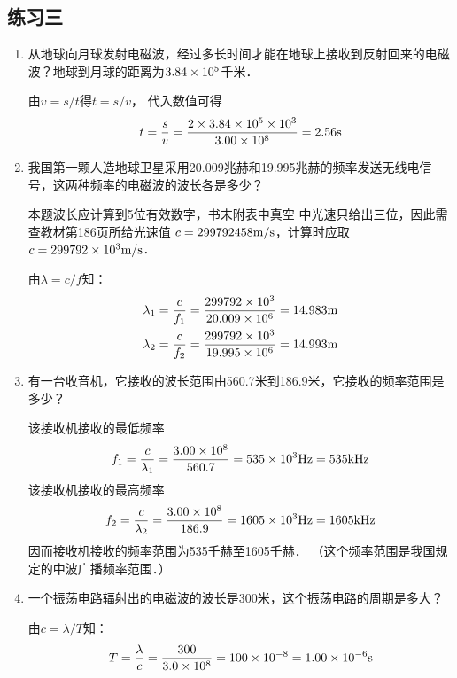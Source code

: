 \subsection{练习三}
\begin{enumerate}
	\item 从地球向月球发射电磁波，经过多长时间才能在地球上接收到反射回来的电磁波？地球到月球的距离为$3.84\times10^5$千米．

    \begin{solution}
由$v=s/t$得$t=s/v$，  代入数值可得
\[t=\frac{s}{v}=\frac{2\times 3.84\times10^5\times 10^3}{3.00\times 10^8}=2.56{\rm s}\]
    \end{solution}
    
	\item 我国第一颗人造地球卫星采用20.009兆赫和19.995兆赫的频率发送无线电信号，这两种频率的电磁波的波长各是多少？

    \begin{solution}
        本题波长应计算到5位有效数字，书末附表中真空
        中光速只给出三位，因此需查教材第186页所给光速值
        $c=299792458\text{m}/\text{s}$，计算时应取$c=299792\times10^3\text{m}/\text{s}$．

由$\lambda=c/f$知：
\[\begin{split}
\lambda_1&=\frac{c}{f_1}=\frac{299792\times10^3}{20.009\times 10^6}=14.983{\rm m}\\
\lambda_2&=\frac{c}{f_2}=\frac{299792\times10^3}{19.995\times 10^6}=14.993{\rm m}\\
\end{split}\]
    \end{solution}
    
	\item 有一台收音机，它接收的波长范围由560.7米到186.9米，它接收的频率范围是多少？

    \begin{solution}
该接收机接收的最低频率
\[f_1=\frac{c}{\lambda_1}=\frac{3.00\times10^8}{560.7}=535\times 10^3{\rm Hz}=535{\rm kHz}\]
该接收机接收的最高频率
\[f_2=\frac{c}{\lambda_2}=\frac{3.00\times10^8}{186.9}=1605\times 10^3{\rm Hz}=1605{\rm kHz}\]
因而接收机接收的频率范围为535千赫至1605千赫．
（这个频率范围是我国规定的中波广播频率范围．）
    \end{solution}
    
	\item 一个振荡电路辐射出的电磁波的波长是300米，这个振荡电路的周期是多大？

    \begin{solution}
由$c=\lambda/T$知：
\[T=\frac{\lambda}{c}=\frac{300}{3.0\times 10^8}=100\times 10^{-8}=1.00\times 10^{-6}{\rm s}\]
    \end{solution}
    
\end{enumerate}



